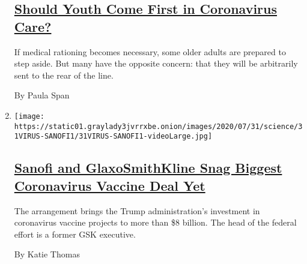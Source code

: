 \begin{enumerate}
{  \subsection{\texorpdfstring{\href{/2020/07/31/health/coronavirus-ethics-rationing-elderly.html}{Should
  Youth Come First in Coronavirus
  Care?}}{Should Youth Come First in Coronavirus Care?}}\label{should-youth-come-first-in-coronavirus-care}}

  If medical rationing becomes necessary, some older adults are prepared
  to step aside. But many have the opposite concern: that they will be
  arbitrarily sent to the rear of the line.

  By Paula Span
\item
  \texttt{[image: https://static01.graylady3jvrrxbe.onion/images/2020/07/31/science/31VIRUS-SANOFI1/31VIRUS-SANOFI1-videoLarge.jpg]}

  \hypertarget{sanofi-and-glaxosmithkline-snag-biggest-coronavirus-vaccine-deal-yet}{%
  \subsection{\texorpdfstring{\href{/2020/07/31/health/covid-19-vaccine-sanofi-gsk.html}{Sanofi
  and GlaxoSmithKline Snag Biggest Coronavirus Vaccine Deal
  Yet}}{Sanofi and GlaxoSmithKline Snag Biggest Coronavirus Vaccine Deal Yet}}\label{sanofi-and-glaxosmithkline-snag-biggest-coronavirus-vaccine-deal-yet}}

  The arrangement brings the Trump administration's investment in
  coronavirus vaccine projects to more than \$8 billion. The head of the
  federal effort is a former GSK executive.

  By Katie Thomas
\end{enumerate}

